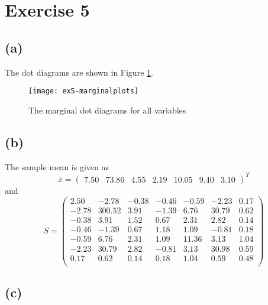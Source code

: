 
\section*{Exercise 5}
\label{sec:exercise5}

\subsection*{(a)}
\label{sec:a-4}

The dot diagrams are shown in Figure \ref{fig:ex5-marginalplots}. 

\begin{figure}[h]
  \centering
  \texttt{[image: ex5-marginalplots]}
  \caption{The marginal dot diagrams for all variables}
  \label{fig:ex5-marginalplots}
\end{figure}

\subsection*{(b)}
\label{sec:b-4}

The sample mean is given as
\begin{equation*}
  \bar{x} =
  \begin{pmatrix}
    7.50 & 73.86 & 4.55 & 2.19 & 10.05 & 9.40 & 3.10 
  \end{pmatrix}^T
\end{equation*}
and
\begin{equation*}
  S =
  \begin{pmatrix}
    2.50 & -2.78 & -0.38 & -0.46 & -0.59 & -2.23 & 0.17 \\ 
    -2.78 & 300.52 & 3.91 & -1.39 & 6.76 & 30.79 & 0.62 \\ 
    -0.38 & 3.91 & 1.52 & 0.67 & 2.31 & 2.82 & 0.14 \\ 
    -0.46 & -1.39 & 0.67 & 1.18 & 1.09 & -0.81 & 0.18 \\ 
    -0.59 & 6.76 & 2.31 & 1.09 & 11.36 & 3.13 & 1.04 \\ 
    -2.23 & 30.79 & 2.82 & -0.81 & 3.13 & 30.98 & 0.59 \\ 
    0.17 & 0.62 & 0.14 & 0.18 & 1.04 & 0.59 & 0.48 \\ 
  \end{pmatrix}
\end{equation*}

\subsection*{(c)}
\label{sec:c-4}

